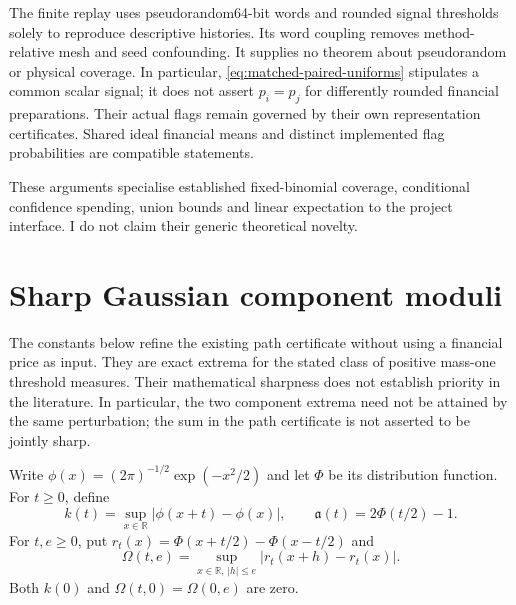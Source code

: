 \documentclass[11pt]{article}
\begin{document}
The finite replay uses pseudorandom64-bit words and rounded signal
thresholds solely to reproduce descriptive histories. Its word coupling
removes method-relative mesh and seed confounding. It supplies no
theorem about pseudorandom or physical coverage. In particular,
\eqref{eq:matched-paired-uniforms} stipulates a common scalar signal;
it does not assert $p_i=p_j$ for differently rounded financial
preparations. Their actual flags remain governed by their own
representation certificates. Shared ideal financial means and distinct
implemented flag probabilities are compatible statements.

These arguments specialise established fixed-binomial coverage,
conditional confidence spending, union bounds and linear expectation to
the project interface. I do not claim their generic theoretical novelty.

\section{Sharp Gaussian component moduli}
\label{sec:sharp-common-information}

The constants below refine the existing path certificate without using a
financial price as input. They are exact extrema for the stated class of
positive mass-one threshold measures. Their mathematical sharpness does
not establish priority in the literature. In particular, the two
component extrema need not be attained by the same perturbation; the
sum in the path certificate is not asserted to be jointly sharp.

Write $\phi(x)=(2\pi)^{-1/2}\exp(-x^2/2)$ and let $\Phi$ be its
distribution function. For $t\geq0$, define
\begin{equation}
 k(t)=\sup_{x\in\mathbb R}|\phi(x+t)-\phi(x)|,
 \qquad \mathfrak a(t)=2\Phi(t/2)-1.
 \label{eq:sharp-k-A}
\end{equation}
For $t,e\geq0$, put $r_t(x)=\Phi(x+t/2)-\Phi(x-t/2)$ and
\begin{equation}
 \Omega(t,e)=\sup_{x\in\mathbb R,\,|h|\leq e}
                    |r_t(x+h)-r_t(x)|.
 \label{eq:sharp-Omega-definition}
\end{equation}
Both $k(0)$ and $\Omega(t,0)=\Omega(0,e)$ are zero.
\end{document}
